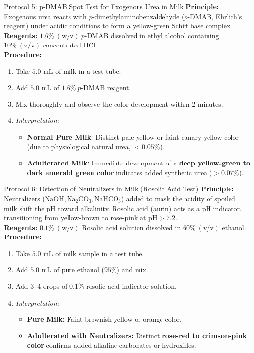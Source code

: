 \documentclass[11pt,a4paper,oneside]{article}
\begin{document}
\begin{protocolbox}{Protocol 5: p-DMAB Spot Test for Exogenous Urea in Milk}
\textbf{Principle:} Exogenous urea reacts with $p$-dimethylaminobenzaldehyde ($p$-DMAB, Ehrlich's reagent) under acidic conditions to form a yellow-green Schiff base complex.\\
\textbf{Reagents:} $1.6\%\ (\text{w/v})\ p$-DMAB dissolved in ethyl alcohol containing $10\%\ (\text{v/v})$ concentrated $\mathrm{HCl}$.\\
\textbf{Procedure:}
\begin{enumerate}
    \item Take $5.0\text{ mL}$ of milk in a test tube.
    \item Add $5.0\text{ mL}$ of $1.6\%\ p$-DMAB reagent.
    \item Mix thoroughly and observe the color development within 2 minutes.
    \item \textit{Interpretation:}
    \begin{itemize}
        \item \textbf{Normal Pure Milk:} Distinct pale yellow or faint canary yellow color (due to physiological natural urea, $<0.05\%$).
        \item \textbf{Adulterated Milk:} Immediate development of a \textbf{deep yellow-green to dark emerald green color} indicates added synthetic urea ($>0.07\%$).
    \end{itemize}
\end{enumerate}
\end{protocolbox}

\begin{protocolbox}{Protocol 6: Detection of Neutralizers in Milk (Rosolic Acid Test)}
\textbf{Principle:} Neutralizers ($\mathrm{NaOH, Na_2CO_3, NaHCO_3}$) added to mask the acidity of spoiled milk shift the pH toward alkalinity. Rosolic acid (aurin) acts as a pH indicator, transitioning from yellow-brown to rose-pink at $\mathrm{pH} > 7.2$.\\
\textbf{Reagents:} $0.1\%\ (\text{w/v})$ Rosolic acid solution dissolved in $60\%\ (\text{v/v})$ ethanol.\\
\textbf{Procedure:}
\begin{enumerate}
    \item Take $5.0\text{ mL}$ of milk sample in a test tube.
    \item Add $5.0\text{ mL}$ of pure ethanol ($95\%$) and mix.
    \item Add 3--4 drops of $0.1\%$ rosolic acid indicator solution.
    \item \textit{Interpretation:}
    \begin{itemize}
        \item \textbf{Pure Milk:} Faint brownish-yellow or orange color.
        \item \textbf{Adulterated with Neutralizers:} Distinct \textbf{rose-red to crimson-pink color} confirms added alkaline carbonates or hydroxides.
    \end{itemize}
\end{enumerate}
\end{protocolbox}
\end{document}
